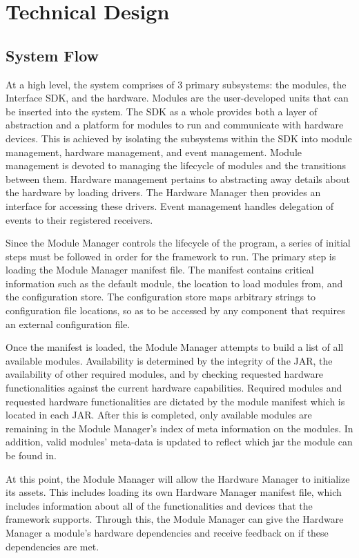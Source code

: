 \documentclass[11pt,letterpaper]{article}
\begin{document}
	\section{Technical Design}

	\subsection{System Flow}

	At a high level, the system comprises of 3 primary subsystems: the modules,
	the Interface SDK, and the hardware. Modules are the user-developed units 
	that can be inserted into the system. The SDK as a whole provides both a 
	layer of abstraction and a platform for modules to run and communicate 
	with hardware devices. This is achieved by isolating the subsystems within 
	the SDK into module management, hardware management, and event management. 
	Module management is devoted to managing the lifecycle of modules and the 
	transitions between them. Hardware management pertains to abstracting away 
	details about the hardware by loading drivers. The Hardware Manager then 
	provides an interface for accessing these drivers. Event management 
	handles delegation of events to their registered receivers.

	Since the Module Manager controls the lifecycle of the program, a series 
	of initial steps must be followed in order for the framework to run. The 
	primary step is loading the Module Manager manifest file. The manifest 
	contains critical information such as the default module, the location to 
	load modules from, and the configuration store. The configuration store 
	maps arbitrary strings to configuration file locations, so as to be 
	accessed by any component that requires an external configuration file.

	Once the manifest is loaded, the Module Manager attempts to build a list 
	of all available modules. Availability is determined by the integrity of 
	the JAR, the availability of other required modules, and by checking requested
	hardware functionalities against the current hardware capabilities. Required
	modules and requested hardware functionalities are dictated by the module
	manifest which is located in each JAR. After this is completed, only available
	modules are remaining in the Module Manager's index of meta information on the
	modules. In addition, valid modules' meta-data is updated to reflect which jar
	the module can be found in.
	
	At this point, the Module Manager will allow the Hardware Manager to 
	initialize its assets. This includes loading its own Hardware Manager 
	manifest file, which includes information about all of the functionalities 
	and devices that the framework supports. Through this, the Module Manager 
	can give the Hardware Manager a module's hardware dependencies and receive
	feedback on if these dependencies are met. 
\end{document}
